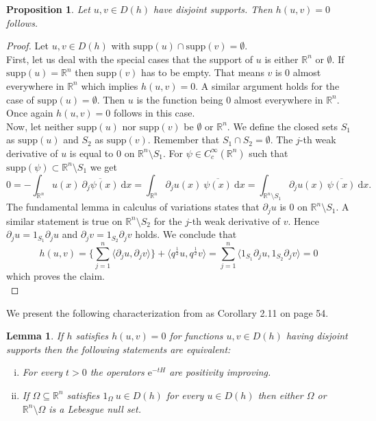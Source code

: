 \documentclass[12pt,longbibliography]{article}
\def\R{\mathbb{R}}
\newtheorem{lem}[thm]{Lemma}
\newtheorem{prp}[thm]{Proposition}
\theoremstyle{definition}
\theoremstyle{remark}
\theoremstyle{example}
\begin{document}
\begin{prp}
Let $u, v \in D(h)$ have disjoint supports. Then $h(u,v) = 0$ follows.
\end{prp}

\begin{proof}
Let $u, v \in D(h)$ with $\mathrm{supp} (u) \cap \mathrm{supp} (v) = \emptyset$.\\

First, let us deal with the special cases that the support of $u$ is either $\R^{n}$ or $\emptyset$.
If $\mathrm{supp} (u) = \R^{n}$ then $\mathrm{supp} (v)$ has to be empty. That means $v$ is $0$ almost everywhere
in $\R^{n}$ which implies $h(u,v) = 0$. A similar argument holds 
for the case of $\mathrm{supp} (u) = \emptyset$. Then $u$ is the function being $0$ almost everywhere in $\R^{n}$.
Once again $h(u,v) = 0$ follows in this case.\\

Now, let neither $\mathrm{supp} (u)$ nor $\mathrm{supp} (v)$ be $\emptyset$ or $\R^{n}$. We define 
the closed sets $S_{1}$ as $\mathrm{supp} (u)$ and $S_{2}$ as $\mathrm{supp} (v)$. Remember that 
$S_{1} \cap S_{2} = \emptyset$. The $j$-th weak derivative of $u$ is equal to $0$ on $\R^{n} \setminus S_{1}$.
For $\psi \in C_{c}^{\infty}(\R^{n})$ such that $\mathrm{supp}(\psi) \subset \R^{n} \setminus S_{1}$ we get
$$
0 = - \int_{\R^{n}} u(x) \ \overline{\partial_{j} \psi (x)} \ \mathrm{d}x = \int_{\R^{n}} \partial_{j} u (x) \  \overline{\psi (x)} \ \mathrm{d}x = 
\int_{\R^{n} \setminus S_{1}} \partial_{j} u (x) \  \overline{\psi (x)} \ \mathrm{d}x.
$$
The fundamental lemma in calculus of variations states that $\partial_{j} u$ is $0$ on $\R^{n} \setminus S_{1}$.
A similar statement is true on $\R^{n} \setminus S_{2}$ for the $j$-th weak derivative of $v$. Hence 
$\partial_{j} u = 1_{S_{1}} \partial_{j} u$ and  $\partial_{j} v = 1_{S_{2}} \partial_{j} v$ holds. We conclude 
that
$$
h(u,v) = \bigl\{ \sum_{j=1}^{n} \langle \partial_{j} u,  \partial_{j} v \rangle   \bigr\} 
+ \langle q^{\frac{1}{2}} u, q^{\frac{1}{2}} v \rangle
 =  \sum_{j=1}^{n} \langle 1_{S_{1}} \partial_{j} u, 1_{S_{2}} \partial_{j} v \rangle = 0
$$
which proves the claim.\\
\end{proof}

We present the following characterization from \cite{Ouhabaz05} as Corollary 2.11 on page 54.\\

\begin{lem}\label{CharacterizationIrreducibilty}
If $h$ satisfies $h(u, v) = 0$ for functions $u, v \in D(h)$ having disjoint 
supports then the following statements are equivalent:
 \begin{enumerate}[i.)]
\item For every $t>0$ the operators $\mathrm{e}^{-tH}$ are positivity improving.
\item If $\Omega \subseteq \R^{n}$ satisfies $1_{\Omega} \ u \in D(h)$ for every 
$u \in D(h)$ then either $\Omega$ or $\R^{n} \setminus \Omega$ is a Lebesgue null set.\\
\end{enumerate} 
\end{lem} 
\end{document}
